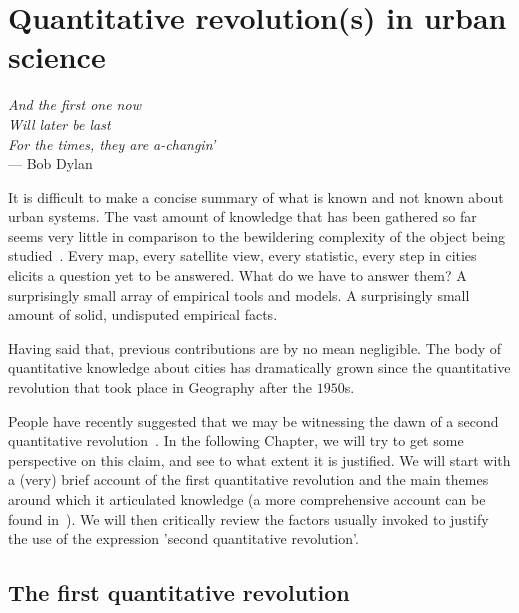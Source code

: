 

\chapter{Quantitative revolution(s) in urban science}
\label{chap:quantitative_revolutions}

\begin{flushright}{\slshape    
And the first one now\\
Will later be last\\
For the times, they are a-changin'} \\ \medskip
--- Bob Dylan 
\end{flushright}


\bigskip


It is difficult to make a concise summary of what is known and not known about
urban systems. The vast amount of knowledge that has been gathered so far seems
very little in comparison to the bewildering complexity of the object being
studied~\cite{Batty:2008}. Every map, every satellite view, every statistic, every step
in cities elicits a question yet to be answered. What do we have to answer them?
A surprisingly small array of empirical tools and models. A surprisingly small
amount of solid, undisputed empirical facts.

Having said that, previous contributions are by no mean negligible. The body of
quantitative knowledge about cities has dramatically grown since the
quantitative revolution that took place in Geography after the $1950$s.

People have recently suggested that we may be witnessing the dawn of a second
quantitative revolution~\cite{Batty:2013}. In the following Chapter, we will try to get some perspective on this claim, and
see to what extent it is justified. We will start with a (very) brief account of the
first quantitative revolution and the main themes around which it articulated
knowledge (a more comprehensive account can be found in~\cite{Sanders:2011}). We
will then critically review the factors usually invoked to justify the
use of the expression 'second quantitative revolution'.



\section{The first quantitative revolution}
\label{sec:the_first_quantitative_revolution}

